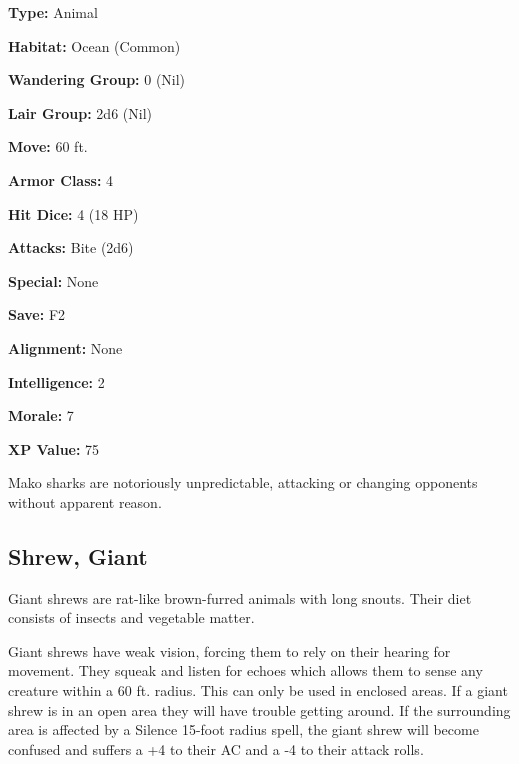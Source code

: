 \begin{multicols*}{2}
{\textbf{Type:} Animal

\textbf{Habitat:} Ocean (Common)

\textbf{Wandering Group:} 0 (Nil)

\textbf{Lair Group:} 2d6 (Nil)

\textbf{Move:} 60 ft.

\textbf{Armor Class:} 4

\textbf{Hit Dice:} 4 (18 HP)

\textbf{Attacks:} Bite (2d6)

\textbf{Special:} None

\textbf{Save:} F2

\textbf{Alignment:} None

\textbf{Intelligence:} 2

\textbf{Morale:} 7

\textbf{XP Value:} 75}

Mako sharks are notoriously unpredictable, attacking or changing opponents without apparent reason.

\subsection{Shrew, Giant}

Giant shrews are rat-like brown-furred animals with long snouts. Their diet consists of insects and vegetable matter.

Giant shrews have weak vision, forcing them to rely on their hearing for movement. They squeak and listen for echoes which allows them to sense any creature within a 60 ft. radius. This can only be used in enclosed areas. If a giant shrew is in an open area they will have trouble getting around. If the surrounding area is affected by a Silence 15-foot radius spell, the giant shrew will become confused and suffers a +4 to their AC and a -4 to their attack rolls.


\end{multicols*}
